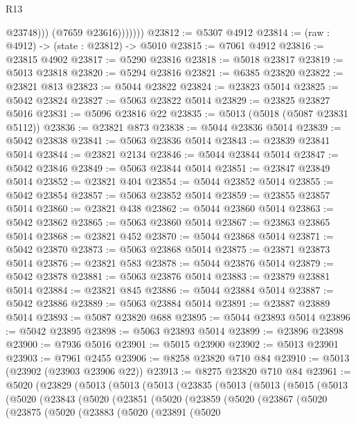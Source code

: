 \begin{lexlean}{R13}
\begin{coremodule}
                      @23748)))
                (@7659 @23616)))))))
@23812 := @5307 @4912
@23814 := (raw : @4912) -> (state : @23812) -> @5010
@23815 := @7061 @4912
@23816 := @23815 @4902
@23817 := @5290 @23816
@23818 := @5018 @23817
@23819 := @5013 @23818
@23820 := @5294 @23816
@23821 := @6385 @23820
@23822 := @23821 @813
@23823 := @5044 @23822
@23824 := @23823 @5014
@23825 := @5042 @23824
@23827 := @5063 @23822 @5014
@23829 := @23825 @23827 @5016
@23831 := @5096 @23816 @22
@23835 := @5013 (@5018 (@5087 @23831 @5112))
@23836 := @23821 @873
@23838 := @5044 @23836 @5014
@23839 := @5042 @23838
@23841 := @5063 @23836 @5014
@23843 := @23839 @23841 @5014
@23844 := @23821 @2134
@23846 := @5044 @23844 @5014
@23847 := @5042 @23846
@23849 := @5063 @23844 @5014
@23851 := @23847 @23849 @5014
@23852 := @23821 @404
@23854 := @5044 @23852 @5014
@23855 := @5042 @23854
@23857 := @5063 @23852 @5014
@23859 := @23855 @23857 @5014
@23860 := @23821 @438
@23862 := @5044 @23860 @5014
@23863 := @5042 @23862
@23865 := @5063 @23860 @5014
@23867 := @23863 @23865 @5014
@23868 := @23821 @452
@23870 := @5044 @23868 @5014
@23871 := @5042 @23870
@23873 := @5063 @23868 @5014
@23875 := @23871 @23873 @5014
@23876 := @23821 @583
@23878 := @5044 @23876 @5014
@23879 := @5042 @23878
@23881 := @5063 @23876 @5014
@23883 := @23879 @23881 @5014
@23884 := @23821 @845
@23886 := @5044 @23884 @5014
@23887 := @5042 @23886
@23889 := @5063 @23884 @5014
@23891 := @23887 @23889 @5014
@23893 := @5087 @23820 @688
@23895 := @5044 @23893 @5014
@23896 := @5042 @23895
@23898 := @5063 @23893 @5014
@23899 := @23896 @23898
@23900 := @7936 @5016
@23901 := @5015 @23900
@23902 := @5013 @23901
@23903 := @7961 @2455
@23906 := @8258 @23820 @710 @84
@23910 := @5013 (@23902 (@23903 @23906 @22))
@23913 := @8275 @23820 @710 @84
@23961 := @5020
    (@23829
      (@5013
        (@5013
          (@5013
            (@23835
              (@5013
                (@5013
                  (@5015
                    (@5013
                      (@5020
                        (@23843
                          (@5020
                            (@23851
                              (@5020
                                (@23859
                                  (@5020
                                    (@23867
                                      (@5020
                                        (@23875
                                          (@5020
                                            (@23883
                                              (@5020
                                                (@23891
                                                  (@5020

\end{coremodule}
\end{lexlean}
